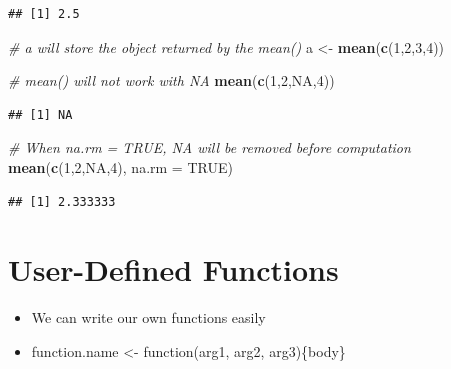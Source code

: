 \documentclass[]{book}
\newenvironment{Shaded}{\begin{snugshade}}{\end{snugshade}}
\newcommand{\CommentTok}[1]{\textcolor[rgb]{0.56,0.35,0.01}{\textit{#1}}}
\newcommand{\DataTypeTok}[1]{\textcolor[rgb]{0.13,0.29,0.53}{#1}}
\newcommand{\DecValTok}[1]{\textcolor[rgb]{0.00,0.00,0.81}{#1}}
\newcommand{\KeywordTok}[1]{\textcolor[rgb]{0.13,0.29,0.53}{\textbf{#1}}}
\newcommand{\NormalTok}[1]{#1}
\newcommand{\OtherTok}[1]{\textcolor[rgb]{0.56,0.35,0.01}{#1}}
\newcommand{\StringTok}[1]{\textcolor[rgb]{0.31,0.60,0.02}{#1}}
\providecommand{\tightlist}{%
  \setlength{\itemsep}{0pt}\setlength{\parskip}{0pt}}
\begin{document}
\begin{verbatim}
## [1] 2.5
\end{verbatim}

\begin{Shaded}
\begin{Highlighting}[]
\CommentTok{# a will store the object returned by the mean()}
\NormalTok{a <-}\StringTok{ }\KeywordTok{mean}\NormalTok{(}\KeywordTok{c}\NormalTok{(}\DecValTok{1}\NormalTok{,}\DecValTok{2}\NormalTok{,}\DecValTok{3}\NormalTok{,}\DecValTok{4}\NormalTok{))   }
\end{Highlighting}
\end{Shaded}

\begin{Shaded}
\begin{Highlighting}[]
\CommentTok{# mean() will not work with NA}
\KeywordTok{mean}\NormalTok{(}\KeywordTok{c}\NormalTok{(}\DecValTok{1}\NormalTok{,}\DecValTok{2}\NormalTok{,}\OtherTok{NA}\NormalTok{,}\DecValTok{4}\NormalTok{))     }
\end{Highlighting}
\end{Shaded}

\begin{verbatim}
## [1] NA
\end{verbatim}

\begin{Shaded}
\begin{Highlighting}[]
\CommentTok{# When na.rm = TRUE, NA will be removed before computation}
\KeywordTok{mean}\NormalTok{(}\KeywordTok{c}\NormalTok{(}\DecValTok{1}\NormalTok{,}\DecValTok{2}\NormalTok{,}\OtherTok{NA}\NormalTok{,}\DecValTok{4}\NormalTok{), }\DataTypeTok{na.rm =} \OtherTok{TRUE}\NormalTok{)    }
\end{Highlighting}
\end{Shaded}

\begin{verbatim}
## [1] 2.333333
\end{verbatim}

\hypertarget{user-defined-functions}{%
\section{User-Defined Functions}\label{user-defined-functions}}

\begin{itemize}
\tightlist
\item
  We can write our own functions easily
\item
  function.name \textless{}- function(arg1, arg2, arg3)\{body\}
\end{itemize}
\end{document}
